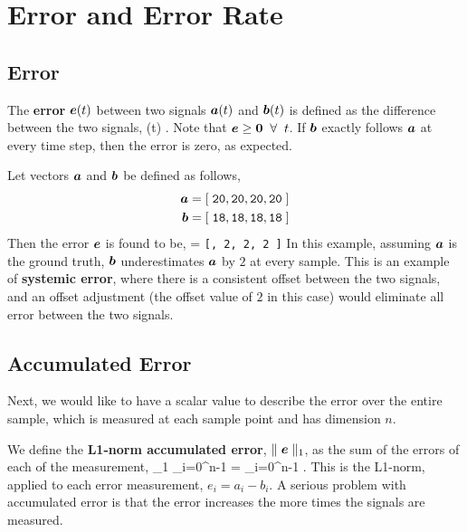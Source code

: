 \section{Error and Error Rate}
\label{section:error-and-error-rate}

\subsection{Error}
The {\bf error} $\mbox{\boldmath $e$}(t)$ between two signals 
$\mbox{\boldmath $a$}(t)$ and $\mbox{\boldmath $b$}(t)$ is 
defined as the difference between the two signals, 
\be
{}(t)  {}.
\ee
Note that $\mbox{\boldmath $e$} \geq \mbox{\boldmath $0$} \;\; \forall \;\; t$.
If $\mbox{\boldmath $b$}$ exactly follows $\mbox{\boldmath $a$}$ at every time step, then the
error is zero, as expected.  

\begin{Hexample}
{
Let vectors $\mbox{\boldmath $a$}$ and $\mbox{\boldmath $b$}$ be defined as follows,
\begin{align}
 \mbox{\boldmath $a$} & = {\tt [\; 20, 20, 20, 20 \;]} \\
 \mbox{\boldmath $b$} & = {\tt [\; 18, 18, 18, 18 \;]}
\end{align}
Then the error $\mbox{\boldmath $e$}$ is found to be,
\be
  = {\tt [, 2, 2, 2 \;]}
\ee
In this example, assuming $\mbox{\boldmath $a$}$ is the ground truth, $\mbox{\boldmath $b$}$ 
underestimates $\mbox{\boldmath $a$}$ by $2$ at every sample.  This is an 
example of {\bf systemic error}, where there is a consistent
offset between the two signals, and an offset adjustment (the
offset value of $2$ in this case) would eliminate all error 
between the two signals.
}
\end{Hexample}

\subsection{Accumulated Error}

Next, we would like to have a scalar value to describe the 
error over the entire sample, which is measured at each sample
point and has dimension $n$. 

We define the {\bf L1-norm accumulated error}, 
$\parallel \mbox{\boldmath $e$} \parallel_1$, as the sum of the errors
of each of the measurement,
\be
\parallel {} \parallel_1 \;  
\sum_{i=0}^{n-1}  = 
\sum_{i=0}^{n-1} .
\ee
This is the L1-norm, applied to each error measurement, $e_i = a_i - b_i$.  
A serious problem with accumulated error is that the error 
increases the more times the signals are measured. 

